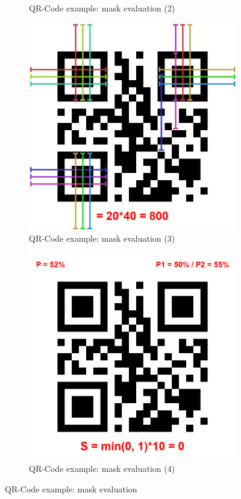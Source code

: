 \begin{figure}[H]
\begin{subfigure}{0.45\textwidth}
    \caption{QR-Code example: mask evaluation (2)}
    \label{fig:qr_mask_ex_eval_2}
  \end{subfigure}
  \begin{subfigure}{0.45\textwidth}
    \centering
    \includegraphics[width=\textwidth]{images/qr_mask_ex_eval_3}
    \caption{QR-Code example: mask evaluation (3)}
    \label{fig:qr_mask_ex_eval_3}
  \end{subfigure}
  \begin{subfigure}{0.45\textwidth}
    \centering
    \includegraphics[width=\textwidth]{images/qr_mask_ex_eval_4}
    \caption{QR-Code example: mask evaluation (4)}
    \label{fig:qr_mask_ex_eval_4}
  \end{subfigure}
  \caption{QR-Code example: mask evaluation}
  \label{fig:qr_mask_ex_eval}
\end{figure}

